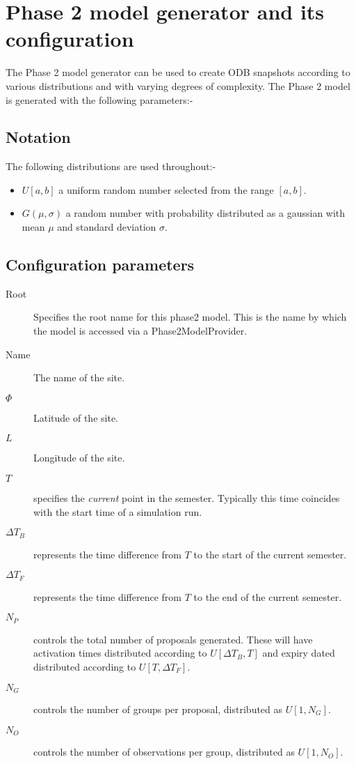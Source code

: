\section{Phase 2 model generator and its configuration}
\label{sect:app_p2gen}

The Phase 2 model generator can be used to create ODB snapshots according to various distributions and with varying degrees of complexity. The Phase 2 model is generated with the following parameters:-

\subsection{Notation}

The following distributions are used throughout:-

\begin{itemize}
\item $U[a,b]$ a uniform random number selected from the range $[a, b]$.
\item $G(\mu, \sigma)$ a random number with probability distributed as a gaussian with mean $\mu$ and standard deviation $\sigma$. 
\end{itemize}

\subsection{Configuration parameters}
\begin{description}
\item [Root] Specifies the root name for this phase2 model. This is the name by which the model is accessed via a Phase2ModelProvider.
\item [Name] The name of the site.
\item [$\Phi$] Latitude of the site.
\item [$L$] Longitude of the site.
\item [$T$]  specifies the \emph{current} point in the semester. Typically this time coincides with the start time of a simulation run.
\item [$\Delta{T_B}$] represents the time difference from $T$ to the start of the current semester.
\item [$\Delta{T_F}$] represents the time difference from $T$ to the end of the current semester.
\item [$N_P$] controls the total number of proposals generated. These will have activation times distributed according to $U[\Delta{T_B}, T]$ and expiry dated distributed according to  $U[T, \Delta{T_F}]$.
\item [$N_G$] controls the number of groups per proposal, distributed as $U[1, N_G]$.
\item [$N_O$] controls the number of observations per group, distributed as $U[1, N_O]$.
\end{description}

